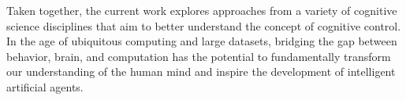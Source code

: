 Taken together, the current work explores approaches from a variety of cognitive science disciplines that aim to better understand the concept of cognitive control. In the age of ubiquitous computing and large datasets, bridging the gap between behavior, brain, and computation has the potential to fundamentally transform our understanding of the human mind and inspire the development of intelligent artificial agents.

\newpage